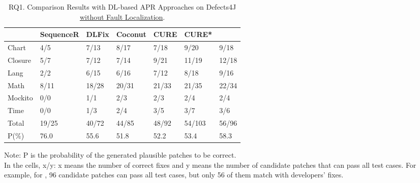 


\begin{table}[t]
  \caption{RQ1. Comparison Results with DL-based APR Approaches on Defects4J \underline {without Fault Localization}.}
  \vspace{-6pt}
  {\small
			\begin{center}
				\renewcommand{\arraystretch}{1}
				\begin{tabular}{p{0.8cm}<{\centering}|p{1.2cm}<{\centering}|p{0.9cm}<{\centering}|p{1cm}<{\centering}|p{0.8cm}<{\centering}|p{0.8cm}<{\centering}|p{0.8cm}<{\centering}}
					
					\hline
					&\textbf{SequenceR}&\textbf{DLFix}& \textbf{Coconut}&\textbf{CURE}&\textbf{CURE*}&\textbf{\tool}\\
					\hline
					Chart  & 4/5   & 7/13  & 8/17  & 7/18  & 9/20  & 9/18\\
					Closure& 5/7   & 7/12  & 7/14  & 9/21 & 11/19  & 12/18\\
					Lang   & 2/2   & 6/15  & 6/16  & 7/12 & 8/18  & 9/16\\
					Math    & 8/11  & 18/28 & 20/31 & 21/33 & 21/35 & 22/34\\
					Mockito & 0/0   & 1/1   & 2/3   & 2/3  &2/4  & 2/4\\
					Time    & 0/0   & 1/3   & 2/4   & 3/5  &3/7  & 3/6\\
					\hline
					Total   & 19/25 & 40/72 & 44/85 & 48/92 & 54/103 & 56/96\\
					\hline
					P(\%)  & 76.0  & 55.6  & 51.8  & 52.2  &  53.4 & 58.3\\
					\hline
				\end{tabular}
			{\footnotesize{
				Note: P is the probability of the generated plausible patches to be correct.\\
				In the cells, x/y: x means the number of correct fixes and y means the number of candidate patches that can pass all test cases. For example, for \tool, 96 candidate patches can pass all test cases, but only 56 of them match with developers' fixes.}}
				\label{RQ1_defect4j}
			\end{center}
                }
		\end{table}


